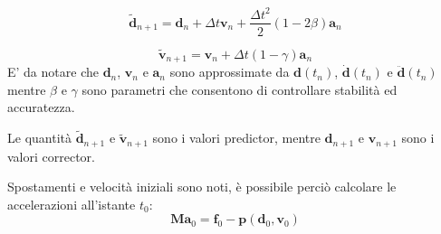 \begin{equation}
		 \boldsymbol{\tilde{d}}_{n+1} = \boldsymbol{d}_n + \varDelta t \boldsymbol{v}_n + \frac{\varDelta t^2 }{2} (1 - 2 \beta) \boldsymbol{a}_n
\end{equation}

\begin{equation}
	 \boldsymbol{\tilde{v}}_{n+1} = \boldsymbol{v}_n + \varDelta t (1 - \gamma) \boldsymbol{a}_n 
\end{equation}
E' da notare che $\boldsymbol{d}_n$, $\boldsymbol{v}_n$ e $\boldsymbol{a}_n$ sono approssimate da $\boldsymbol{d}(t_n)$, $\boldsymbol{\dot{d}}(t_n)$ e $\boldsymbol{\ddot{d}}(t_n)$ mentre $\beta$ e $\gamma$ sono parametri che consentono di controllare stabilità ed accuratezza.

Le quantità $\boldsymbol{\tilde{d}}_{n+1}$ e $\boldsymbol{\tilde{v}}_{n+1}$ sono i valori predictor, mentre $\boldsymbol{d}_{n+1}$ e $\boldsymbol{v}_{n+1}$ sono i valori corrector. 

Spostamenti e velocità iniziali sono noti, è possibile perciò calcolare le accelerazioni all'istante $t_0$:
\begin{equation}
	\boldsymbol{M a}_0 = \boldsymbol{f}_0 - \boldsymbol{p}(\boldsymbol{d}_0, \boldsymbol{v}_0)
\end{equation}

